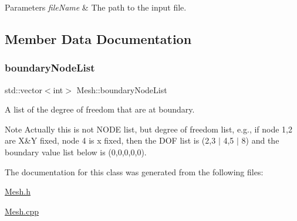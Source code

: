 \begin{DoxyParams}{Parameters}
{\em file\+Name} & The path to the input file. \\
\hline
\end{DoxyParams}


\subsection{Member Data Documentation}
\mbox{\label{class_mesh_a5a1c5739ef85c8f9071f689e790b5251}} 
\subsubsection{\texorpdfstring{boundary\+Node\+List}{boundaryNodeList}}
{\footnotesize\ttfamily std\+::vector$<$int$>$ Mesh\+::boundary\+Node\+List}



A list of the degree of freedom that are at boundary. 

\begin{DoxyNote}{Note}
Actually this is not N\+O\+DE list, but degree of freedom list, e.\+g., if node 1,2 are X\&Y fixed, node 4 is x fixed, then the D\+OF list is (2,3 $\vert$ 4,5 $\vert$ 8) and the boundary value list below is (0,0,0,0,0). 
\end{DoxyNote}


The documentation for this class was generated from the following files\+:\begin{DoxyCompactItemize}
\item 
\mbox{\hyperlink{_mesh_8h}{Mesh.\+h}}\item 
\mbox{\hyperlink{_mesh_8cpp}{Mesh.\+cpp}}\end{DoxyCompactItemize}

